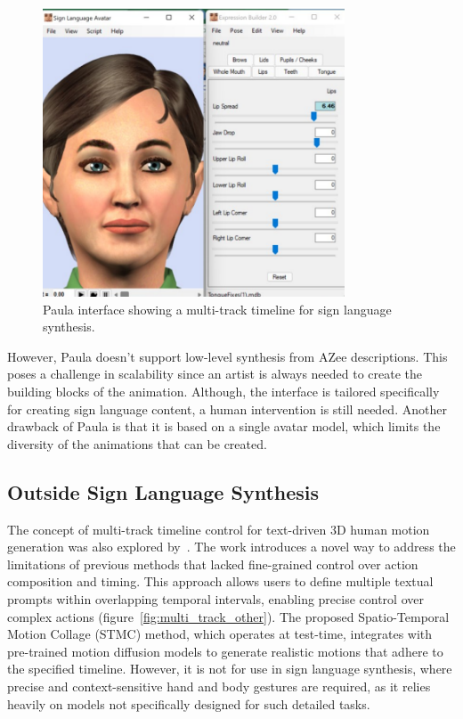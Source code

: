 \documentclass[../../main.tex]{subfiles}
\begin{document}
\begin{figure}[h]
    \centering
    \includegraphics[width=0.8\textwidth]{chapters/multi_track/images/paula.png}
    \caption{Paula interface showing a multi-track timeline for sign language synthesis.}
    \label{fig:paula}
\end{figure}

However, Paula doesn't support low-level synthesis from AZee descriptions. This poses a challenge in scalability since an artist is always needed to create the building blocks of the animation. Although, the interface is tailored specifically for creating sign language content, a human intervention is still needed. Another drawback of Paula is that it is based on a single avatar model, which limits the diversity of the animations that can be created.

\subsection{Outside Sign Language Synthesis}
\label{ch:multi_track:related_work:other_multi_track}

The concept of multi-track timeline control for text-driven 3D human motion generation was also explored by~\cite{petrovich24stmc}. The work introduces a novel way to address the limitations of previous methods that lacked fine-grained control over action composition and timing. This approach allows users to define multiple textual prompts within overlapping temporal intervals, enabling precise control over complex actions (figure~\ref{fig:multi_track_other}). The proposed Spatio-Temporal Motion Collage (STMC) method, which operates at test-time, integrates with pre-trained motion diffusion models to generate realistic motions that adhere to the specified timeline. However, it is not for use in sign language synthesis, where precise and context-sensitive hand and body gestures are required, as it relies heavily on models not specifically designed for such detailed tasks.
\end{document}
